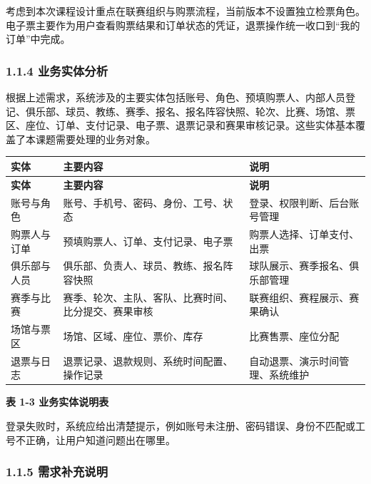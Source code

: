 \documentclass[UTF8,zihao=-4,a4paper]{ctexart}
\newcommand{\tablecaptionline}[1]{\vspace{-1.6em}\begin{center}\small\bfseries #1\end{center}\vspace{0.2em}}
\begin{document}
考虑到本次课程设计重点在联赛组织与购票流程，当前版本不设置独立检票角色。电子票主要作为用户查看购票结果和订单状态的凭证，退票操作统一收口到“我的订单”中完成。

\subsubsection*{1.1.4 业务实体分析}
{}

根据上述需求，系统涉及的主要实体包括账号、角色、预填购票人、内部人员登记、俱乐部、球员、教练、赛季、报名、报名阵容快照、轮次、比赛、场馆、票区、座位、订单、支付记录、电子票、退票记录和赛果审核记录。这些实体基本覆盖了本课题需要处理的业务对象。


\begin{center}
\small
\begin{longtable}{>{\raggedright\arraybackslash}p{} >{\raggedright\arraybackslash}p{} >{\raggedright\arraybackslash}p{}}
\toprule
\rowcolor{tablehead}
\textbf{实体} & \textbf{主要内容} & \textbf{说明} \\
\midrule
\endfirsthead
\toprule
\rowcolor{tablehead}
\textbf{实体} & \textbf{主要内容} & \textbf{说明} \\
\midrule
\endhead
账号与角色 & 账号、手机号、密码、身份、工号、状态 & 登录、权限判断、后台账号管理 \\
\midrule
购票人与订单 & 预填购票人、订单、支付记录、电子票 & 购票人选择、订单支付、出票 \\
\midrule
俱乐部与人员 & 俱乐部、负责人、球员、教练、报名阵容快照 & 球队展示、赛季报名、俱乐部管理 \\
\midrule
赛季与比赛 & 赛季、轮次、主队、客队、比赛时间、比分提交、赛果审核 & 联赛组织、赛程展示、赛果确认 \\
\midrule
场馆与票区 & 场馆、区域、座位、票价、库存 & 比赛售票、座位分配 \\
\midrule
退票与日志 & 退票记录、退款规则、系统时间配置、操作记录 & 自动退票、演示时间管理、系统维护 \\
\midrule
\bottomrule
\end{longtable}
\end{center}

\tablecaptionline{表 1-3 业务实体说明表}

登录失败时，系统应给出清楚提示，例如账号未注册、密码错误、身份不匹配或工号不正确，让用户知道问题出在哪里。

\subsubsection*{1.1.5 需求补充说明}
{}
\end{document}
